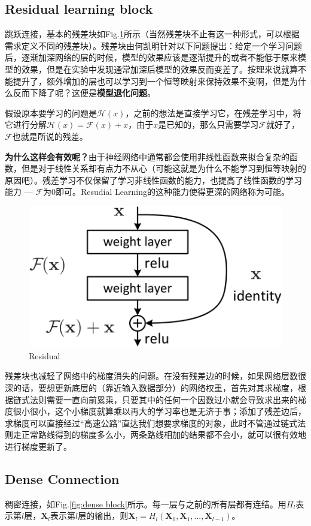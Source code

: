 \subsection{Residual learning block}
跳跃连接，基本的残差块如Fig.\ref{fig:residual}所示（当然残差块不止有这一种形式，可以根据需求定义不同的残差块）。残差块由何凯明针对以下问题提出：给定一个学习问题后，逐渐加深网络的层的时候，模型的效果应该是逐渐提升的或者不能低于原来模型的效果，但是在实验中发现通常加深后模型的效果反而变差了。按理来说就算不能提升了，额外增加的层也可以学习到一个恒等映射来保持效果不变啊，但是为什么反而下降了呢？这便是\textbf{模型退化问题}。

假设原本要学习的问题是$\mathcal{H}(x)$，之前的想法是直接学习它，在残差学习中，将它进行分解$\mathcal{H}(x) = \mathcal{F}(x) + x$，由于$x$是已知的，那么只需要学习$\mathcal{F}$就好了，$\mathcal{F}$也就是所说的残差。

\textbf{为什么这样会有效呢？}由于神经网络中通常都会使用非线性函数来拟合复杂的函数，但是对于线性关系却有点力不从心（可能这就是为什么不能学习到恒等映射的原因吧）。残差学习不仅保留了学习非线性函数的能力，也提高了线性函数的学习能力 --- $\mathcal{F}$为0即可。Resudial Learning的这种能力使得更深的网络称为可能。

\begin{figure}[h]
	\centering
	\includegraphics[width=.4\textwidth]{pics/Residual.png}
	\caption{Residual}
	\label{fig:residual}
\end{figure}

残差块也减轻了网络中的梯度消失的问题。在没有残差边的时候，如果网络层数很深的话，要想更新底层的（靠近输入数据部分）的网络权重，首先对其求梯度，根据链式法则需要一直向前累乘，只要其中的任何一个因数过小就会导致求出来的梯度很小很小，这个小梯度就算乘以再大的学习率也是无济于事；添加了残差边后，求梯度可以直接经过“高速公路”直达我们想要求梯度的对象，此时不管通过链式法则走正常路线得到的梯度多么小，两条路线相加的结果都不会小，就可以很有效地进行梯度更新了。

\subsection{Dense Connection}
稠密连接，如Fig.\ref{fig:dense block}所示。每一层与之前的所有层都有连结。用$H_l$表示第$l$层，$\boldsymbol{X}_l$表示第$l$层的输出，则$\boldsymbol{X}_l = H_l(\boldsymbol{X}_0, \boldsymbol{X}_1, ..., \boldsymbol{X}_{l-1})$。

